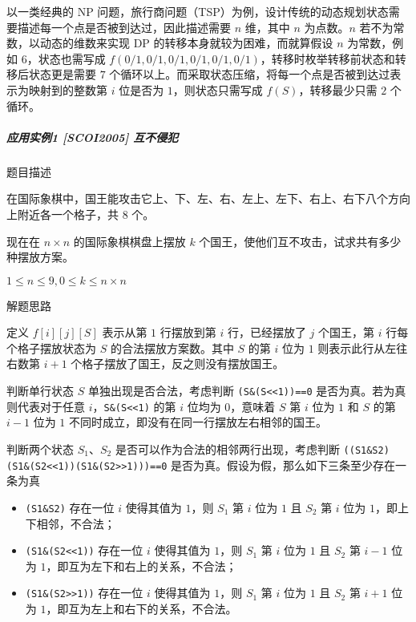 以一类经典的 NP
问题，旅行商问题（TSP）为例，设计传统的动态规划状态需要描述每一个点是否被到达过，因此描述需要
\(n\) 维，其中 \(n\) 为点数。\(n\) 若不为常数，以动态的维数来实现 DP
的转移本身就较为困难，而就算假设 \(n\) 为常数，例如 \(6\)，状态也需写成
\(f(0/1,0/1,0/1,0/1,0/1,0/1)\)，转移时枚举转移前状态和转移后状态更是需要
\(7\)
个循环以上。而采取状态压缩，将每一个点是否被到达过表示为映射到的整数第
\(i\) 位是否为 \(1\)，则状态只需写成 \(f(S)\)，转移最少只需 \(2\)
个循环。

\subparagraph{应用实例1 {[}SCOI2005{]} 互不侵犯}

题目描述

在国际象棋中，国王能攻击它上、下、左、右、左上、左下、右上、右下八个方向上附近各一个格子，共
\(8\) 个。

现在在 \(n\times n\) 的国际象棋棋盘上摆放 \(k\)
个国王，使他们互不攻击，试求共有多少种摆放方案。

\(1\le n\le 9,0\le k\le n\times n\)

解题思路

定义 \(f[i][j][S]\) 表示从第 \(1\) 行摆放到第 \(i\) 行，已经摆放了 \(j\)
个国王，第 \(i\) 行每个格子摆放状态为 \(S\) 的合法摆放方案数。其中 \(S\)
的第 \(i\) 位为 \(1\) 则表示此行从左往右数第 \(i+1\)
个格子摆放了国王，反之则没有摆放国王。

判断单行状态 \(S\) 单独出现是否合法，考虑判断
\texttt{(S\&(S\textless{}\textless{}1))==0}
是否为真。若为真则代表对于任意
\(i\)，\texttt{S\&(S\textless{}\textless{}1)} 的第 \(i\) 位均为
\(0\)，意味着 \(S\) 第 \(i\) 位为 \(1\) 和 \(S\) 的第 \(i-1\) 位为 \(1\)
不同时成立，即没有在同一行摆放左右相邻的国王。

判断两个状态 \(S_1\)、\(S_2\) 是否可以作为合法的相邻两行出现，考虑判断
\texttt{((S1\&S2)\textbar{}\textbar{}(S1\&(S2\textless{}\textless{}1))\textbar{}\textbar{}(S1\&(S2\textgreater{}\textgreater{}1)))==0}
是否为真。假设为假，那么如下三条至少存在一条为真

\begin{itemize}
\tightlist
\item
  \texttt{(S1\&S2)} 存在一位 \(i\) 使得其值为 \(1\)，则 \(S_1\) 第 \(i\)
  位为 \(1\) 且 \(S_2\) 第 \(i\) 位为 \(1\)，即上下相邻，不合法；
\item
  \texttt{(S1\&(S2\textless{}\textless{}1))} 存在一位 \(i\) 使得其值为
  \(1\)，则 \(S_1\) 第 \(i\) 位为 \(1\) 且 \(S_2\) 第 \(i-1\) 位为
  \(1\)，即互为左下和右上的关系，不合法；
\item
  \texttt{(S1\&(S2\textgreater{}\textgreater{}1))} 存在一位 \(i\)
  使得其值为 \(1\)，则 \(S_1\) 第 \(i\) 位为 \(1\) 且 \(S_2\) 第 \(i+1\)
  位为 \(1\)，即互为左上和右下的关系，不合法。
\end{itemize}

